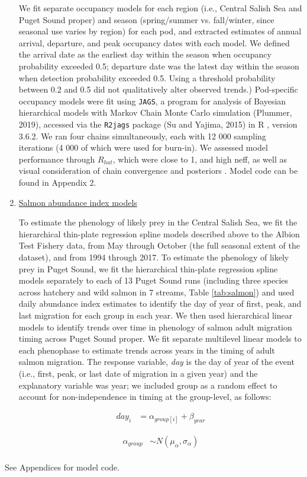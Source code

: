 \documentclass{article}
\begin{document}
\begin{enumerate}
 
\par We fit separate occupancy models for each region (i.e., Central Salish Sea and Puget Sound proper) and season (spring/summer vs. fall/winter, since seasonal use varies by region) for each pod, and extracted estimates of annual arrival, departure, and peak occupancy dates with each model. We defined the arrival date as the earliest day within the season when occupancy probability exceeded 0.5; departure date was the latest day within the season when detection probability exceeded 0.5. Using a threshold probability between 0.2 and 0.5 did not qualitatively alter observed trends.) Pod-specific occupancy models were fit using \texttt{JAGS}, a program for analysis of Bayesian hierarchical models with Markov Chain Monte Carlo simulation (Plummer, 2019), accessed via the \texttt{R2jags} package (Su and Yajima, 2015) in R \citep{Rcore2019}, version 3.6.2. We ran four chains simultaneously, each with 12 000 sampling iterations (4 000 of which were used for burn-in). We assessed model performance through $R_{hat}$, which were close to 1, and high neff, as well as visual consideration of chain convergence and posteriors \citep{BDA}. Model code can be found in Appendix 2.
\item \underline {Salmon abundance index models}
\par To estimate the phenology of likely prey in the Central Salish Sea, we fit the hierarchical thin-plate regression spline models described above to the Albion Test Fishery data, from May through October (the full seasonal extent of the dataset), and from 1994 through 2017. To estimate the phenology of likely prey in Puget Sound, we fit the hierarchical thin-plate regression spline models separately to each of 13 Puget Sound runs (including three species across hatchery and wild salmon in 7 streams, Table \ref{tab:salmon}) and used daily abundance index estimates to identify the day of year of first, peak, and last migration for each group in each year. We then used hierarchical linear models to identify trends over time in phenology of salmon adult migration timing across Puget Sound proper.  We fit  separate multilevel linear models to each phenophase to estimate trends across years in the timing of adult salmon migration. The response variable, \emph{day} is the day of year of the event (i.e., first, peak, or last date of migration in a given year) and the explanatory variable was year; we included group as a random effect to account for non-independence in timing at the group-level, as follows:

\begin{align*}
day_i &= \alpha_{group[i]} + \beta_{year}
\end{align*}

\begin{align*}
\alpha_{group} & \sim N(\mu_{\alpha}, \sigma_{\alpha}) \\
\end{align*}

\end{enumerate}
See Appendices for model code.
\end{document}
